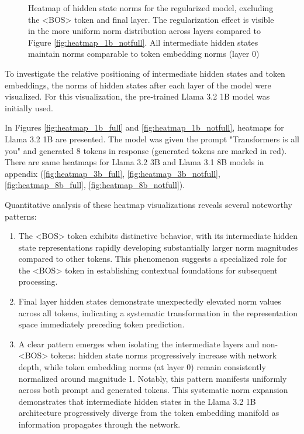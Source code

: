 \begin{figure}[t]
\begin{minipage}{0.48\textwidth}
        \caption{Heatmap of hidden state norms for the regularized model, excluding the <BOS> token and final layer. The regularization effect is visible in the more uniform norm distribution across layers compared to Figure \ref{fig:heatmap_1b_notfull}. All intermediate hidden states maintain norms comparable to token embedding norms (layer 0)}
        \label{fig:heatmap_150m_reg_notall}
    \end{minipage}
\end{figure}


To investigate the relative positioning of intermediate hidden states and token embeddings, the norms of hidden states after each layer of the model were visualized. For this visualization, the pre-trained Llama 3.2 1B model was initially used.

In Figures \ref{fig:heatmap_1b_full} and \ref{fig:heatmap_1b_notfull}, heatmaps for Llama 3.2 1B are presented. The model was given the prompt "Transformers is all you" and generated 8 tokens in response (generated tokens are marked in red). There are same heatmaps for Llama 3.2 3B and Llama 3.1 8B models in appendix (\ref{fig:heatmap_3b_full}, \ref{fig:heatmap_3b_notfull}, \ref{fig:heatmap_8b_full}, \ref{fig:heatmap_8b_notfull}).

Quantitative analysis of these heatmap visualizations reveals several noteworthy patterns:
\begin{enumerate}
    \item The <BOS> token exhibits distinctive behavior, with its intermediate hidden state representations rapidly developing substantially larger norm magnitudes compared to other tokens. This phenomenon suggests a specialized role for the <BOS> token in establishing contextual foundations for subsequent processing.
    \item Final layer hidden states demonstrate unexpectedly elevated norm values across all tokens, indicating a systematic transformation in the representation space immediately preceding token prediction.
    \item A clear pattern emerges when isolating the intermediate layers and non-<BOS> tokens: hidden state norms progressively increase with network depth, while token embedding norms (at layer 0) remain consistently normalized around magnitude 1. Notably, this pattern manifests uniformly across both prompt and generated tokens. This systematic norm expansion demonstrates that intermediate hidden states in the Llama 3.2 1B architecture progressively diverge from the token embedding manifold as information propagates through the network.
\end{enumerate}

